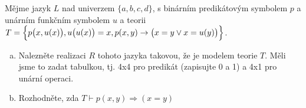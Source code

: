 \subsubsection{}
Mějme jazyk $L$ nad univerzem $\{a, b, c, d\}$, s binárním
predikátovým symbolem $p$ a unárním funkčním symbolem $u$
a teorii $T = \Bigl\{ p\bigl(x,u(x)\bigr), u\bigl(u(x)\bigr)=x, p(x,y)
\rightarrow \bigl(x = y \vee x = u(y)\bigr) \Bigr\}$.  
\begin{enumerate}[a)]
  \item Nalezněte realizaci $R$ tohoto jazyka takovou, že je modelem teorie $T$. Měli jsme to zadat
tabulkou, tj. 4x4 pro predikát (zapisujte 0 a 1) a 4x1 pro unární operaci.
  \item Rozhodněte, zda $T \vdash p(x, y) \Rightarrow (x = y)$
\end{enumerate}
